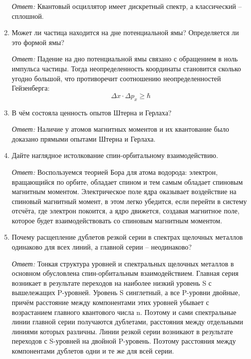 \begin{enumerate}
\emph{Ответ:}
Квантовый осциллятор имеет дискретный спектр, а классический -- сплошной.

\item Может ли частица находится на дне потенциальной ямы? Определяется ли это
формой ямы?

\emph{Ответ:}
Падение на дно потенциальной ямы связано с обращением в ноль импульса частицы.
Тогда неопределенность координаты становится сколько угодно большой, что
противоречит соотношению неопределенностей Гейзенберга:
\[
    \Delta x \cdot \Delta p_x \ge \hbar
\]

\item В чём состояла ценность опытов Штерна и Герлаха?

\emph{Ответ:}
Наличие у атомов магнитных моментов и их квантование было доказано прямыми
опытами Штерна и Герлаха.

\item Дайте наглядное истолкование спин-орбитальному взаимодействию.

\emph{Ответ:}
Воспользуемся теорией Бора для атома водорода: электрон, вращающийся по орбите,
обладает спином и тем самым обладает спиновым магнитным моментом. Электрическое
поле ядра оказывает воздействие на спиновый магнитный момент, в этом легко
убедится, если перейти в систему отсчёта, где электрон покоится, а ядро
движется, создавая магнитное поле, которое будет взаимодействовать со спиновым
магнитным моментом.

\item Почему расщепление дублетов резкой серии в спектрах щелочных металлов
одинаково для всех линий, а главной серии -- неодинаково?

\emph{Ответ:}
Тонкая структура уровней и спектральных щелочных металлов в основном обусловлена
спин-орбитальным взаимодействием. Главная серия возникает в результате переходов
на наиболее низкий уровень S с вышележащих P-уровней. Уровень S синглетный, а
все P-уровни двойные, причём расстояние между компонентами этих уровней убывает
с возрастанием главного квантового числа n. Поэтому и сами спектральные линии
главной серии получаются дублетами, расстояния между отдельными линиями которых
различны. Линии резкой серии возникают в результате переходов с S-уровней на
двойной P-уровень. Поэтому расстояния между компонентами дублетов одни и те же
для всей серии.


\end{enumerate}
